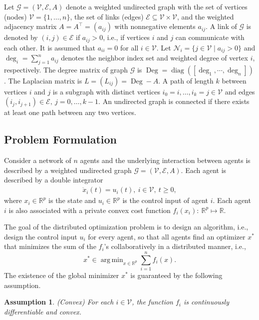 \documentclass[letterpaper, 10 pt, conference]{ieeeconf}  %
\newtheorem{assumption}{Assumption}
\DeclareMathOperator{\diag}{diag}
\DeclareMathOperator{\Deg}{Deg}
\DeclareMathOperator*{\argmin}{arg\,min}
\begin{document}
Let $\mathcal G=(\mathcal V,\mathcal E, A)$ denote a weighted undirected graph with the set of vertices (nodes) $\mathcal V =\{1,\dots,n\}$, the set of links (edges) $\mathcal E
\subseteq \mathcal V \times \mathcal V$, and the weighted adjacency matrix
$A =A^{\top}=(a_{ij})$ with nonnegative elements $a_{ij}$. A link of $\mathcal G$ is denoted by $(i,j)\in \mathcal E$ if $a_{ij}>0$, i.e., if vertices $i$ and $j$ can communicate with each other. It is assumed that $a_{ii}=0$ for all $i\in \mathcal V$. Let $\mathcal{N}_i=\{j\in \mathcal V\mid a_{ij}>0\}$ and $\deg_i=\sum\limits_{j=1}^{n}a_{ij}$ denotes the neighbor index set and weighted degree of vertex $i$, respectively. The degree matrix of graph $\mathcal G$ is $\Deg=\diag([\deg_1, \cdots, \deg_n])$. The Laplacian matrix is $L=(L_{ij})=\Deg-A$. A  path of length $k$ between vertices $i$ and $j$ is a subgraph with distinct vertices $i_0=i,\dots,i_k=j\in\mathcal V$ and edges $(i_j,i_{j+1})\in\mathcal E,~j=0,\dots,k-1$.
An undirected graph is  connected if there exists at least one path between any two vertices.






\subsection{Problem Formulation}
Consider a network of $n$ agents and the underlying interaction between agents is described by a weighted undirected graph $\mathcal G=(\mathcal V,\mathcal E, A)$.
Each agent is described by a double integrator
\begin{align}\label{cdc18so:doublesystem}
\ddot{x}_i(t)=u_i(t),~i\in\mathcal V,~t\ge0,
\end{align}
where $x_i\in\mathbb{R}^p$ is the state and $u_i\in\mathbb{R}^p$ is the control input of agent $i$.
Each agent $i$ is also associated with a private convex cost function $f_i(x_i):~\mathbb{R}^p\mapsto\mathbb{R}$.

The goal of the distributed optimization problem is to design an algorithm, i.e., design the control input $u_i$ for every agent, so that all agents find an optimizer $x^*$ that minimizes the sum of the $f_i$'s collaboratively in a distributed manner, i.e.,
\begin{equation}\label{cdc18so:eqn:xopt}
  x^* \in \argmin_{x \in \mathbb{R}^p} \sum^{n}_{i=1} f_i(x).
\end{equation}
The existence  of the global minimizer $x^*$ is guaranteed by the following assumption.
\begin{assumption}\label{cdc18so:ass:filc} (Convex)
For each $i\in \mathcal{V}$, the function $f_i$ is continuously differentiable and  convex.
\end{assumption}
\end{document}
